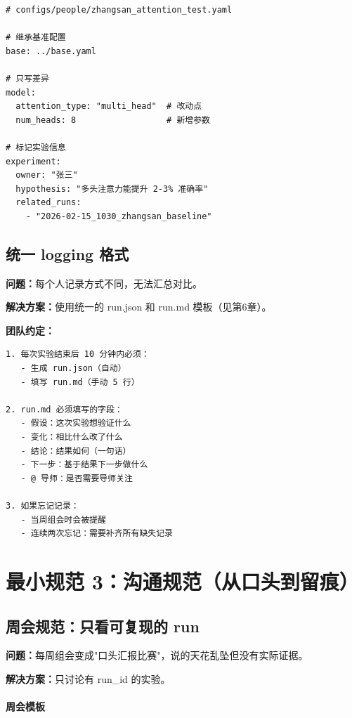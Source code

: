 \begin{verbatim}
# configs/people/zhangsan_attention_test.yaml

# 继承基准配置
base: ../base.yaml

# 只写差异
model:
  attention_type: "multi_head"  # 改动点
  num_heads: 8                  # 新增参数

# 标记实验信息
experiment:
  owner: "张三"
  hypothesis: "多头注意力能提升 2-3% 准确率"
  related_runs:
    - "2026-02-15_1030_zhangsan_baseline"
\end{verbatim}

\subsection{统一 logging 格式}

\textbf{问题：}每个人记录方式不同，无法汇总对比。

\textbf{解决方案：}使用统一的 run.json 和 run.md 模板（见第6章）。

\textbf{团队约定：}
\begin{verbatim}
1. 每次实验结束后 10 分钟内必须：
   - 生成 run.json（自动）
   - 填写 run.md（手动 5 行）

2. run.md 必须填写的字段：
   - 假设：这次实验想验证什么
   - 变化：相比什么改了什么
   - 结论：结果如何（一句话）
   - 下一步：基于结果下一步做什么
   - @ 导师：是否需要导师关注

3. 如果忘记记录：
   - 当周组会时会被提醒
   - 连续两次忘记：需要补齐所有缺失记录
\end{verbatim}

\section{最小规范 3：沟通规范（从口头到留痕）}

\subsection{周会规范：只看可复现的 run}

\textbf{问题：}每周组会变成"口头汇报比赛"，说的天花乱坠但没有实际证据。

\textbf{解决方案：}只讨论有 run\_id 的实验。

\paragraph{周会模板}

